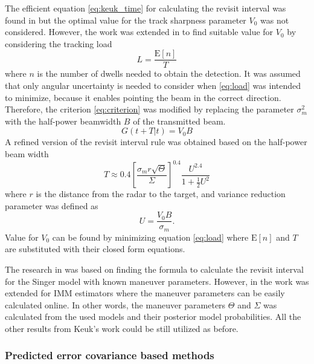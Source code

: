 \documentclass[11pt,a4paper]{article}
\newcommand{\E}[1]{\mathrm{E}\left[ #1 \right]}
\begin{document}
The efficient equation \eqref{eq:keuk_time} for calculating the revisit interval was found in \cite{Keuk1975} but the optimal value for the track sharpness parameter $V_0$ was not considered.
However, the work was extended in \cite{vanKeuk1993} to find suitable value for $V_0$ by considering the tracking load
\begin{equation}\label{eq:load}
    L = \frac{\E{n}}{T}
\end{equation}
where $n$ is the number of dwells needed to obtain the detection.
It was assumed that only angular uncertainty is needed to consider when \eqref{eq:load} was intended to minimize, 
because it enables pointing the beam in the correct direction.
Therefore, the criterion \eqref{eq:criterion} was modified by replacing the parameter $\sigma_m^2$ with the half-power beamwidth $B$ of the transmitted beam.
\begin{equation} \label{eq:criterion2}
    G(t + T | t) = V_0 B
\end{equation}
A refined version of the revisit interval rule was obtained based on the half-power beam width
\begin{equation}
    T \approx 0.4 \left[ \frac{\sigma_m r \sqrt{\Theta}}{\Sigma} \right]^{0.4} \frac{U^{2.4}}{1+\frac{1}{2}U^2}
\end{equation}
where $r$ is the distance from the radar to the target, and variance reduction parameter was defined as
\begin{equation}
    U = \frac{V_0 B}{\sigma_m}.
\end{equation}
Value for $V_0$ can be found by minimizing equation \eqref{eq:load} where $\E{n}$ and $T$ are substituted with their closed form equations.

The research in \cite{Keuk1975, vanKeuk1993} was based on finding the formula to calculate the revisit interval for the Singer model with known maneuver parameters.
However, in \cite{Shin1995} the work was extended for IMM estimators where the maneuver parameters can be easily calculated online.
In other words, the maneuver parameters $\Theta$ and $\Sigma$ was calculated from the used models and their posterior model probabilities.
All the other results from Keuk's work could be still utilized as before.

\subsubsection{Predicted error covariance based methods}
\end{document}
